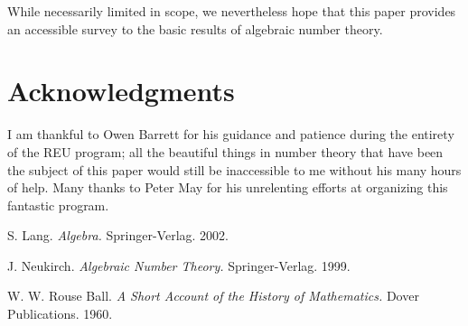 \documentclass[psamsfonts]{amsart}
\theoremstyle{definition}
\theoremstyle{remark}
\numberwithin{equation}{section}
\begin{document}
While necessarily limited in scope, we nevertheless hope that this paper provides an accessible survey to the basic results of algebraic number theory.











\section*{Acknowledgments}
I am thankful to Owen Barrett for his guidance and patience during the entirety of the REU program; all the beautiful things in number theory that have been the subject of this paper would still be inaccessible to me without his many hours of help. Many thanks to Peter May for his unrelenting efforts at organizing this fantastic program.

\begin{thebibliography}{9}

S. Lang.
\emph{Algebra.}
Springer-Verlag. 2002.

J. Neukirch.
\emph{Algebraic Number Theory.}
Springer-Verlag. 1999.

W. W. Rouse Ball.
\emph{A Short Account of the History of Mathematics.}
Dover Publications. 1960.

\end{thebibliography}
\end{document}
